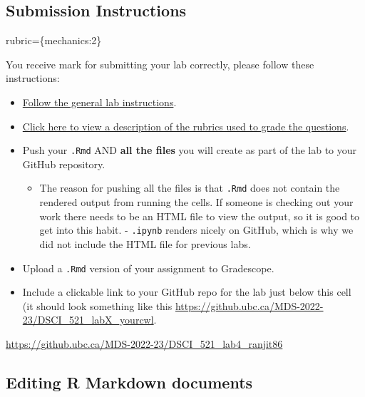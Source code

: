 \documentclass[
]{article}
\providecommand{\tightlist}{%
  \setlength{\itemsep}{0pt}\setlength{\parskip}{0pt}}
\begin{document}
\begin{alert alert-info}
\hypertarget{submission-instructions}{%
\subsection{Submission Instructions}\label{submission-instructions}}

rubric=\{mechanics:2\}

You receive mark for submitting your lab correctly, please follow these
instructions:

\begin{itemize}
\tightlist
\item
  \href{https://ubc-mds.github.io/resources_pages/general_lab_instructions/}{Follow
  the general lab instructions}.
\item
  \href{https://github.com/UBC-MDS/public/tree/master/rubric}{Click here
  to view a description of the rubrics used to grade the questions}.
\item
  Push your \texttt{.Rmd} AND \textbf{all the files} you will create as
  part of the lab to your GitHub repository.

  \begin{itemize}
  \tightlist
  \item
    The reason for pushing all the files is that \texttt{.Rmd} does not
    contain the rendered output from running the cells. If someone is
    checking out your work there needs to be an HTML file to view the
    output, so it is good to get into this habit. - \texttt{.ipynb}
    renders nicely on GitHub, which is why we did not include the HTML
    file for previous labs.
  \end{itemize}
\item
  Upload a \texttt{.Rmd} version of your assignment to Gradescope.
\item
  Include a clickable link to your GitHub repo for the lab just below
  this cell (it should look something like this
  \url{https://github.ubc.ca/MDS-2022-23/DSCI_521_labX_yourcwl}.
\end{itemize}
\end{alert alert-info}

\url{https://github.ubc.ca/MDS-2022-23/DSCI_521_lab4_ranjit86}

\hypertarget{editing-r-markdown-documents}{%
\subsection{Editing R Markdown
documents}\label{editing-r-markdown-documents}}
\end{document}
